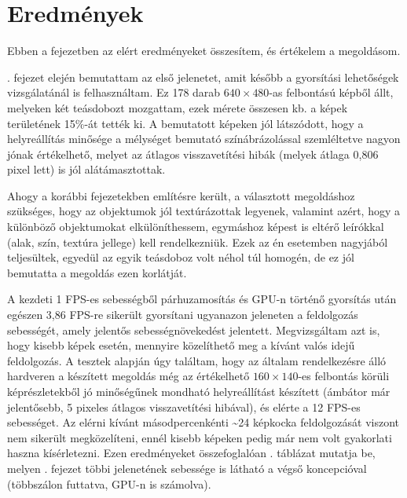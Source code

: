 \chapter{Eredmények}

Ebben a fejezetben az elért eredményeket összesítem, és értékelem a megoldásom.

. fejezet elején bemutattam az első jelenetet, amit később a gyorsítási lehetőségek vizsgálatánál is felhasználtam. Ez 178 darab $640\times 480$-as felbontású képből állt, melyeken két teásdobozt mozgattam, ezek mérete összesen kb. a képek területének 15\%-át tették ki. A bemutatott képeken jól látszódott, hogy a helyreállítás minősége a mélységet bemutató színábrázolással szemléltetve nagyon jónak értékelhető, melyet az átlagos visszavetítési hibák (melyek átlaga 0,806 pixel lett) is jól alátámasztottak.

Ahogy a korábbi fejezetekben említésre került, a választott megoldáshoz szükséges, hogy az objektumok jól textúrázottak legyenek, valamint azért, hogy a különböző objektumokat elkülöníthessem, egymáshoz képest is eltérő leírókkal (alak, szín, textúra jellege) kell rendelkezniük. Ezek az én esetemben nagyjából teljesültek, egyedül az egyik teásdoboz volt néhol túl homogén, de ez jól bemutatta a megoldás ezen korlátját.

A kezdeti 1 FPS-es sebességből párhuzamosítás és GPU-n történő gyorsítás után egészen 
3,86 FPS-re sikerült gyorsítani ugyanazon jeleneten a feldolgozás sebességét, amely jelentős sebességnövekedést jelentett. Megvizsgáltam azt is, hogy kisebb képek esetén, mennyire közelíthető meg a kívánt valós idejű feldolgozás. A tesztek alapján úgy találtam, hogy az általam rendelkezésre álló hardveren a készített megoldás még az értékelhető $160\times 140$-es felbontás körüli képrészletekből jó minőségűnek mondható helyreállítást készített (ámbátor már jelentősebb, 5 pixeles átlagos visszavetítési hibával), és elérte a 12 FPS-es sebességet. Az elérni kívánt másodpercenkénti \textasciitilde 24 képkocka feldolgozását viszont nem sikerült megközelíteni, ennél kisebb képeken pedig már nem volt gyakorlati haszna kísérletezni. Ezen eredményeket összefoglalóan . táblázat mutatja be, melyen . fejezet többi jelenetének sebessége is látható a végső koncepcióval (többszálon futtatva, GPU-n is számolva).

